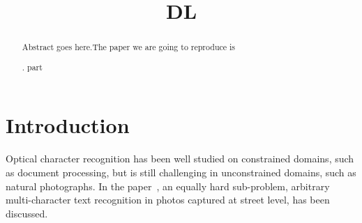 \documentclass[conference]{IEEEtran}
\begin{document}
\title{DL}


\author{
\and
{}
\and
{}
}


\maketitle


\begin{abstract}
Abstract goes here.The paper we are going to reproduce is~\cite{street} 

.  part  






\end{abstract}





%
\IEEEpeerreviewmaketitle



\section{Introduction}
Optical character recognition has been well studied on constrained domains, such as document processing, but is still challenging in unconstrained domains, such as natural photographs. In the paper~\cite{street}, an equally hard sub-problem, arbitrary multi-character text recognition in photos captured at street level, has been discussed.
\end{document}
